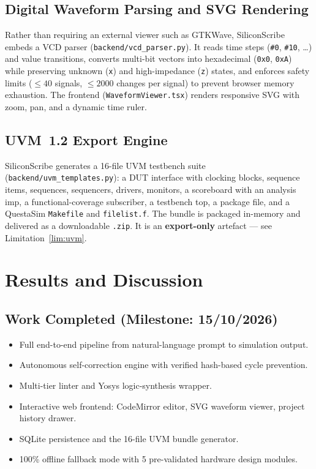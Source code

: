 \documentclass[11pt,a4paper]{article}
\begin{document}
\subsection{Digital Waveform Parsing and SVG Rendering}
Rather than requiring an external viewer such as GTKWave, SiliconScribe embeds a
VCD parser (\texttt{backend/vcd\_parser.py}). It reads time steps
(\texttt{\#0}, \texttt{\#10}, \ldots) and value transitions, converts multi-bit
vectors into hexadecimal (\texttt{0x0}, \texttt{0xA}) while preserving unknown
(\texttt{x}) and high-impedance (\texttt{z}) states, and enforces safety limits
($\le 40$ signals, $\le 2000$ changes per signal) to prevent browser memory
exhaustion. The frontend (\texttt{WaveformViewer.tsx}) renders responsive SVG with
zoom, pan, and a dynamic time ruler.

\subsection{UVM~1.2 Export Engine}
SiliconScribe generates a 16-file UVM testbench suite
(\texttt{backend/uvm\_templates.py}): a DUT interface with clocking blocks, sequence
items, sequences, sequencers, drivers, monitors, a scoreboard with an analysis
imp, a functional-coverage subscriber, a testbench top, a package file, and a
QuestaSim \texttt{Makefile} and \texttt{filelist.f}. The bundle is packaged
in-memory and delivered as a downloadable \texttt{.zip}. It is an
\textbf{export-only} artefact --- see Limitation~\ref{lim:uvm}.

\section{Results and Discussion}
\label{sec:results}

\subsection{Work Completed (Milestone: 15/10/2026)}
\begin{itemize}
\item Full end-to-end pipeline from natural-language prompt to simulation output.
\item Autonomous self-correction engine with verified hash-based cycle prevention.
\item Multi-tier linter and Yosys logic-synthesis wrapper.
\item Interactive web frontend: CodeMirror editor, SVG waveform viewer, project
history drawer.
\item SQLite persistence and the 16-file UVM bundle generator.
\item 100\% offline fallback mode with 5 pre-validated hardware design modules.
\end{itemize}
\end{document}
